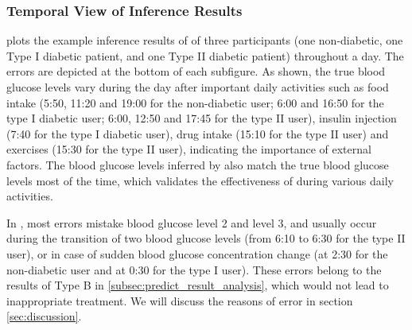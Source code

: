 \subsubsection{Temporal View of Inference Results}
\label{subsec:Inference_Results}
 plots the example inference results of \sysname of three participants (one non-diabetic, one Type I diabetic patient, and one Type II diabetic patient) throughout a day.
The errors are depicted at the bottom of each subfigure.
As shown, the true blood glucose levels vary during the day after important daily activities such as food intake (5:50, 11:20 and 19:00 for the non-diabetic user; 6:00 and 16:50 for the type I diabetic user; 6:00, 12:50 and 17:45 for the type II user), insulin injection (7:40 for the type I diabetic user), drug intake (15:10 for the type II user) and exercises (15:30 for the type II user), indicating the importance of external factors.
The blood glucose levels inferred by \sysname also match the true blood glucose levels most of the time, which validates the effectiveness of \sysname during various daily activities.

\textcolor[rgb]{1.00,0.00,0.00}{In , most errors mistake blood glucose level 2 and level 3, and usually occur during the transition of two blood glucose levels (\eg from 6:10 to 6:30 for the type II user), or in case of sudden blood glucose concentration change (\eg at 2:30 for the non-diabetic user and at 0:30 for the type I user).
These errors  belong to the results of Type B in \ref{subsec:predict_result_analysis}, which would not lead to inappropriate treatment. We will discuss the reasons of error in section \ref{sec:discussion}.}



